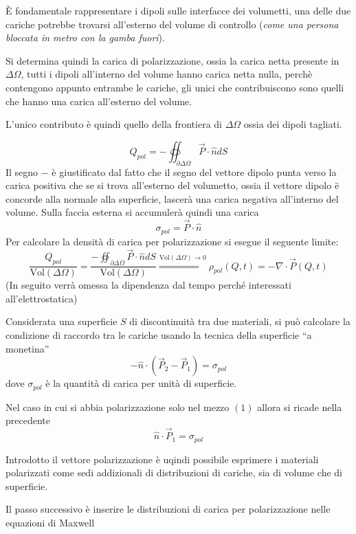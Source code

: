 
È fondamentale rappresentare i dipoli sulle interfacce
dei volumetti, una delle due cariche potrebbe trovarsi
all'esterno del volume di controllo (\textit{come una persona 
bloccata in metro con la gamba fuori}).

Si determina quindi la carica di polarizzazione, ossia la 
carica netta presente in $\Delta\Omega$, tutti i dipoli
all'interno del volume hanno carica netta nulla, perchè 
contengono appunto entrambe le cariche, gli unici che 
contribuiscono sono quelli che hanno una carica all'esterno 
del volume.

L'unico contributo è quindi quello della frontiera di
$\Delta\Omega$ ossia dei dipoli tagliati.

$$
Q_{pol} = -\oiint_{\partial\Delta\Omega} \vec{P}\cdot\hat{n}dS
$$
Il segno $-$ è giustificato dal fatto che il segno del vettore
dipolo punta verso la carica positiva che se si trova all'esterno
del volumetto, ossia il vettore dipolo ë concorde alla normale
alla superficie, lascerà una carica negativa all'interno del 
volume.
Sulla faccia esterna si accumulerà quindi una carica 
$$
\sigma_{pol} = \vec{P}\cdot\hat{n}
$$
Per calcolare la densità di carica per polarizzazione si esegue il 
seguente limite:
$$
\frac{Q_{pol}}{\text{Vol}(\Delta\Omega)} = 
\frac{-\oiint_{\partial\Delta\Omega} \vec{P}\cdot\hat{n}dS}
{\text{Vol}(\Delta\Omega)} \stackrel{\text{Vol}(\Delta\Omega)\to 0}{\Rightarrow} \rho_{pol}(Q,t) = -\nabla\cdot\vec{P}(Q,t)
$$
(In seguito verrà omessa la dipendenza dal tempo perché interessati 
all'elettrostatica)

Considerata una superficie $S$ di discontinuità tra due materiali,
si può calcolare la condizione di raccordo tra le cariche usando 
la tecnica della superficie ``a monetina''
$$
-\hat{n}\cdot(\vec{P}_2-\vec{P}_1) = \sigma_{pol}
$$
dove $\sigma_{pol}$ è la quantità di carica per unità di superficie.

Nel caso in cui si abbia polarizzazione solo nel mezzo $(1)$
allora si ricade nella precedente
$$
\hat{n}\cdot\vec{P}_1 = \sigma_{pol}
$$

Introdotto il vettore polarizzazione è uqindi possibile esprimere
i materiali polarizzati come sedi addizionali di distribuzioni di 
cariche, sia di volume che di superficie.

Il passo successivo è inserire le distribuzioni di carica per 
polarizzazione nelle equazioni di Maxwell

